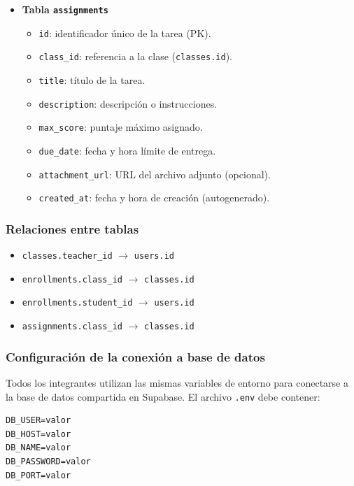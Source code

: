 \documentclass[12pt,a4paper]{article}
\begin{document}
\begin{itemize}
    \item \textbf{Tabla \texttt{assignments}}
    \begin{itemize}
        \item \texttt{id}: identificador único de la tarea (PK).
        \item \texttt{class\_id}: referencia a la clase (\texttt{classes.id}).
        \item \texttt{title}: título de la tarea.
        \item \texttt{description}: descripción o instrucciones.
        \item \texttt{max\_score}: puntaje máximo asignado.
        \item \texttt{due\_date}: fecha y hora límite de entrega.
        \item \texttt{attachment\_url}: URL del archivo adjunto (opcional).
        \item \texttt{created\_at}: fecha y hora de creación (autogenerado).
    \end{itemize}
\end{itemize}

\subsubsection*{Relaciones entre tablas}

\begin{itemize}
    \item \texttt{classes.teacher\_id} $\rightarrow$ \texttt{users.id}
    \item \texttt{enrollments.class\_id} $\rightarrow$ \texttt{classes.id}
    \item \texttt{enrollments.student\_id} $\rightarrow$ \texttt{users.id}
    \item \texttt{assignments.class\_id} $\rightarrow$ \texttt{classes.id}
\end{itemize}

\subsubsection*{Configuración de la conexión a base de datos}

Todos los integrantes utilizan las mismas variables de entorno para conectarse a la base de datos compartida en Supabase. El archivo \texttt{.env} debe contener:

\begin{verbatim}
DB_USER=valor
DB_HOST=valor
DB_NAME=valor
DB_PASSWORD=valor
DB_PORT=valor
\end{verbatim}
\end{document}
